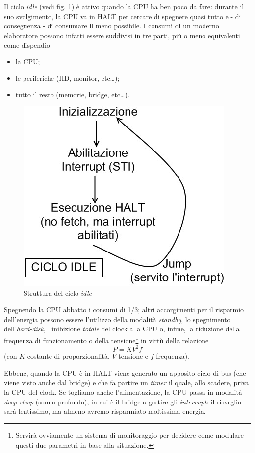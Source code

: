 Il ciclo \textit{idle} (vedi fig. \ref{fig:halt}) è attivo quando la CPU ha ben poco da fare: durante il suo svolgimento, la CPU va in HALT per cercare di spegnere quasi tutto e - di conseguenza - di consumare il meno possibile. I consumi di un moderno elaboratore possono infatti essere suddivisi in tre parti, più o meno equivalenti come dispendio:
\begin{itemize}
\item la CPU;
\item le periferiche (HD, monitor, etc\ldots);
\item tutto il resto (memorie, bridge, etc\ldots).
\end{itemize}

\begin{figure}[!h]
\centering
\includegraphics[width=0.55\columnwidth]{img/halt}
\caption{Struttura del ciclo \textit{idle}}
\label{fig:halt}
\end{figure}

Spegnendo la CPU abbatto i consumi di 1/3; altri accorgimenti per il risparmio dell'energia possono essere l'utilizzo della modalità \textit{standby}, lo spegnimento dell'\textit{hard-disk}, l'inibizione \textit{totale} del clock alla CPU o, infine, la riduzione della frequenza di funzionamento o della tensione\footnote{Servirà ovviamente un sistema di monitoraggio per decidere come modulare questi due parametri in base alla situazione.} in virtù della relazione
\[
P=KV^2f
\]
(con $K$ costante di proporzionalità, $V$ tensione e $f$ frequenza).

Ebbene, quando la CPU è in HALT viene generato un apposito ciclo di bus (che viene visto anche dal bridge) e che fa partire un \textit{timer} il quale, allo scadere, priva la CPU del clock.
Se togliamo anche l'alimentazione, la CPU passa in modalità \textit{deep sleep} (sonno profondo), in cui è il bridge a gestire gli \textit{interrupt}: il risveglio sarà lentissimo, ma almeno avremo risparmiato moltissima energia.

